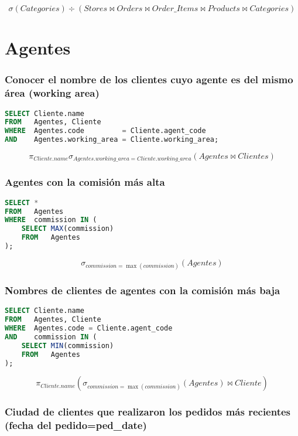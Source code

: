 \[\sigma(Categories)\div(Stores\bowtie Orders\bowtie Order\_Items\bowtie Products\bowtie Categories)\]

\pagebreak

\section{Agentes}

\subsubsection{Conocer el nombre de los clientes cuyo agente es del mismo área (working area)}

\begin{lstlisting}[language=SQL]
SELECT Cliente.name
FROM   Agentes, Cliente
WHERE  Agentes.code         = Cliente.agent_code
AND    Agentes.working_area = Cliente.working_area;
\end{lstlisting}

\[\pi_{Cliente.name}\sigma_{Agentes.working\_area=Cliente.working\_area}(Agentes\bowtie Clientes)\]

\subsubsection{Agentes con la comisión más alta}

\begin{lstlisting}[language=SQL]
SELECT *
FROM   Agentes
WHERE  commission IN (
	SELECT MAX(commission)
	FROM   Agentes
);
\end{lstlisting}

\[\sigma_{commission=\max(commission)}(Agentes)\]

\subsubsection{Nombres de clientes de agentes con la comisión más baja}

\begin{lstlisting}[language=SQL]
SELECT Cliente.name
FROM   Agentes, Cliente
WHERE  Agentes.code = Cliente.agent_code
AND    commission IN (
	SELECT MIN(commission)
	FROM   Agentes
);
\end{lstlisting}

\[\pi_{Cliente.name}(\sigma_{commission=\max(commission)}(Agentes)\bowtie Cliente)\]

\subsubsection{Ciudad de clientes que realizaron los pedidos más recientes (fecha del pedido=ped\_date)}

